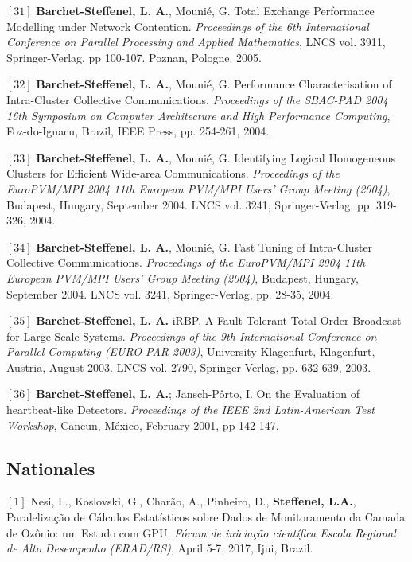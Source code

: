 \documentclass[final,twoside]{hdr} %
\begin{document}
\vspace{1em} \noindent $[31]$
\textbf{Barchet-Steffenel, L. A.}, Mounié, G. {Total Exchange Performance Modelling under Network Contention}. {\em Proceedings of the 6th International Conference on Parallel Processing and Applied Mathematics}, LNCS vol. 3911, Springer-Verlag, pp 100-107. Poznan, Pologne. 2005. 

\vspace{1em} \noindent $[32]$
\textbf{Barchet-Steffenel, L. A.}, Mounié, G. {Performance Characterisation of Intra-Cluster Collective Communications}. {\em Proceedings of the SBAC-PAD 2004 16th Symposium on Computer Architecture and High Performance Computing}, Foz-do-Iguacu, Brazil, IEEE Press, pp. 254-261, 2004. 

\vspace{1em} \noindent $[33]$
\textbf{Barchet-Steffenel, L. A.}, Mounié, G. {Identifying Logical Homogeneous Clusters for Efficient Wide-area Communications}. {\em Proceedings of the EuroPVM/MPI 2004 11th European PVM/MPI Users' Group Meeting (2004)}, Budapest, Hungary, September 2004. LNCS vol. 3241, Springer-Verlag, pp. 319-326, 2004. 

\vspace{1em} \noindent $[34]$
\textbf{Barchet-Steffenel, L. A.}, Mounié, G. {Fast Tuning of Intra-Cluster Collective Communications}. {\em Proceedings of the EuroPVM/MPI 2004 11th European PVM/MPI Users' Group Meeting (2004)}, Budapest, Hungary, September 2004. LNCS vol. 3241, Springer-Verlag, pp. 28-35, 2004. 

\vspace{1em} \noindent $[35]$
\textbf{Barchet-Steffenel, L. A.} {iRBP, A Fault Tolerant Total Order Broadcast for Large Scale Systems}. {\em Proceedings of the 9th International Conference on Parallel Computing (EURO-PAR 2003)}, University Klagenfurt, Klagenfurt, Austria, August 2003. LNCS vol. 2790, Springer-Verlag, pp. 632-639, 2003. 

\vspace{1em} \noindent $[36]$
\textbf{Barchet-Steffenel, L. A.}; Jansch-Pôrto, I. {On the Evaluation of heartbeat-like Detectors}. {\em Proceedings of the IEEE 2nd Latin-American Test Workshop}, Cancun, México, February 2001, pp 142-147. 


\subsection*{Nationales}

\noindent $[1]$
Nesi, L., Koslovski, G., Charão, A., Pinheiro, D., \textbf{Steffenel, L.A.}, {Paralelização de Cálculos Estatísticos sobre Dados de Monitoramento da Camada de Ozônio: um Estudo com GPU}. {\em Fórum de iniciação científica Escola Regional de Alto Desempenho (ERAD/RS)}, April 5-7, 2017, Ijui, Brazil.
\end{document}
